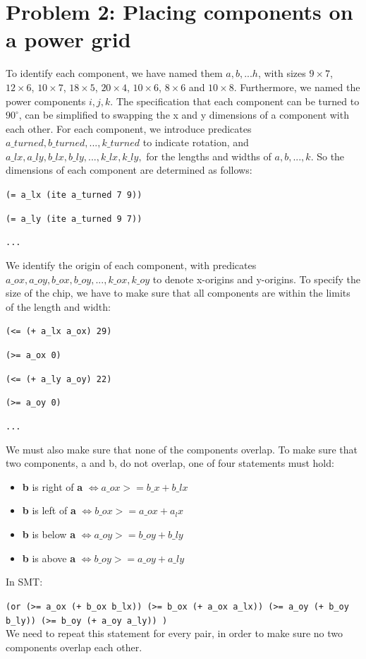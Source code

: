 \documentclass[a4paper]{article}
\begin{document}
	\section*{Problem 2: Placing components on a power grid}
	To identify each component, we have named them $a, b, ... h$, with sizes $9 \times 7$, $12 \times 6$, $10 \times 7$, $18 \times 5$, $20 \times 4$, $10 \times 6$, $8 \times 6$ and $10 \times 8$. Furthermore, we named the power components $i, j, k$. 
	The specification that each component can be turned to $90^{\circ}$, can be simplified to swapping the x and y dimensions of a component with each other. For each component, we introduce predicates $a\_turned, b\_turned, ..., k\_turned$ to indicate rotation, and $a\_lx, a\_ly, b\_lx, b\_ly, ..., k\_lx, k\_ly,$ for the lengths and widths of $a, b, ..., k$. So the dimensions of each component are determined as follows:

	{\tt (= a\_lx (ite a\_turned 7 9))}
	
	{\tt (= a\_ly (ite a\_turned 9 7))}
	
	{\tt ...}
	
	\noindent We identify the origin of each component, with predicates $a\_ox, a\_oy, b\_ox, b\_oy, ..., k\_ox, k\_oy$ to denote x-origins and y-origins. To specify the size of the chip, we have to make sure that all components are within the limits of the length and width:
	
	{\tt (<= (+ a\_lx a\_ox) 29)}
	
	{\tt (>= a\_ox 0)}
	
	{\tt (<= (+ a\_ly a\_oy) 22)}
	
	{\tt (>= a\_oy 0)}
	
	{\tt ...}
	
	\noindent We must also make sure that none of the components overlap. To make sure that two components, a and b, do not overlap, one of four statements must hold:
	\begin{itemize}
		\item \textbf{b} is right of \textbf{a} $\Leftrightarrow a\_ox >= b\_x + b\_lx$
		\item \textbf{b} is left of \textbf{a} $\Leftrightarrow b\_ox >= a\_ox + a_lx$
		\item \textbf{b} is below \textbf{a} $\Leftrightarrow a\_oy >= b\_oy + b\_ly$
		\item \textbf{b} is above \textbf{a} $\Leftrightarrow b\_oy >= a\_oy + a\_ly$
	\end{itemize}
	In SMT:
	
	{\tt (or (>= a\_ox (+ b\_ox b\_lx)) (>= b\_ox (+ a\_ox a\_lx)) (>= a\_oy (+ b\_oy b\_ly)) (>= b\_oy (+ a\_oy a\_ly)) )}\\
	\noindent We need to repeat this statement for every pair, in order to make sure no two components overlap each other.\\
	
\end{document}
